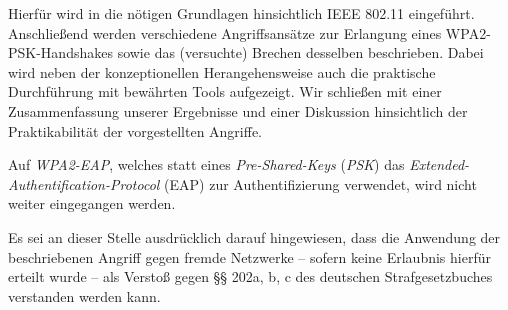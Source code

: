 Hierfür wird in die nötigen Grundlagen hinsichtlich IEEE 802.11 eingeführt.
Anschließend werden verschiedene Angriffsansätze zur Erlangung eines WPA2-PSK-Handshakes sowie das (versuchte) Brechen desselben beschrieben. 
Dabei wird neben der konzeptionellen Herangehensweise auch die praktische Durchführung mit bewährten Tools aufgezeigt. 
Wir schließen mit einer Zusammenfassung unserer Ergebnisse und einer Diskussion hinsichtlich der Praktikabilität der vorgestellten Angriffe.

Auf \textit{WPA2-EAP}, welches statt eines \textit{Pre-Shared-Keys} (\textit{PSK}) das \textit{Extended-Authenti\-fication-Protocol} (EAP) zur Authentifizierung verwendet, wird nicht weiter eingegangen werden.

Es sei an dieser Stelle ausdrücklich darauf hingewiesen, dass die Anwendung der beschriebenen Angriff gegen fremde Netzwerke -- sofern keine Erlaubnis hierfür erteilt wurde -- als Verstoß gegen §§ 202a, b, c des deutschen Strafgesetzbuches verstanden werden kann.
